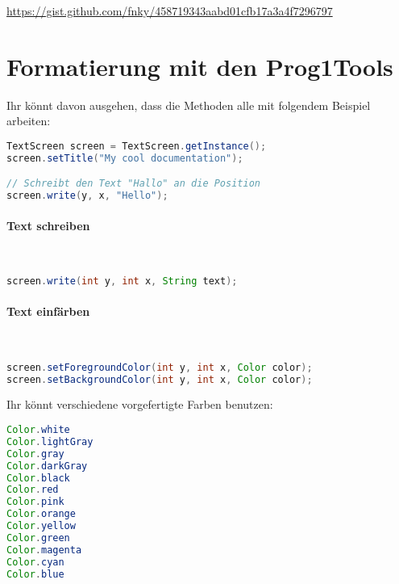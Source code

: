 \documentclass[12pt,a4paper]{article}
\begin{document}
\url{https://gist.github.com/fnky/458719343aabd01cfb17a3a4f7296797}

\newpage
\section{Formatierung mit den Prog1Tools}

Ihr könnt davon ausgehen, dass die Methoden alle mit folgendem Beispiel arbeiten:

\begin{tcolorbox}[frame empty,nobeforeafter,colback=gray!5]
\begin{lstlisting}[language=java,basicstyle=\ttfamily]
TextScreen screen = TextScreen.getInstance();
screen.setTitle("My cool documentation");

// Schreibt den Text "Hallo" an die Position
screen.write(y, x, "Hello");
\end{lstlisting}
\end{tcolorbox}

\paragraph{Text schreiben}\

\begin{tcolorbox}[frame empty,nobeforeafter,colback=gray!5]
\begin{lstlisting}[language=java,basicstyle=\ttfamily]
screen.write(int y, int x, String text);
\end{lstlisting}
\end{tcolorbox}

\paragraph{Text einfärben}\

\begin{tcolorbox}[frame empty,nobeforeafter,colback=gray!5]
\begin{lstlisting}[language=java,basicstyle=\ttfamily]
screen.setForegroundColor(int y, int x, Color color);
screen.setBackgroundColor(int y, int x, Color color);
\end{lstlisting}
\end{tcolorbox}

Ihr könnt verschiedene vorgefertigte Farben benutzen:

\begin{tcolorbox}[frame empty,nobeforeafter,colback=gray!5]
\begin{lstlisting}[language=java,basicstyle=\ttfamily]
Color.white
Color.lightGray
Color.gray
Color.darkGray
Color.black
Color.red
Color.pink
Color.orange
Color.yellow
Color.green
Color.magenta
Color.cyan
Color.blue
\end{lstlisting}
\end{tcolorbox}
\end{document}
